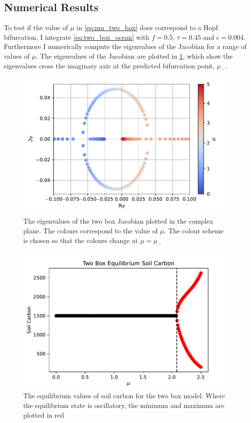 \subsection{Numerical Results}
To test if the value of $\mu$ in \cref{eq:mu_two_box} does correspond to a Hopf bifurcation, I integrate \cref{eq:two_box_ocean} with $f = 0.5$, $\tau = 0.45$ and $\epsilon = 0.004$.
Furthermore I numerically compute the eigenvalues of the Jacobian for a range of values of $\mu$. The eigenvalues of the Jacobian are plotted in \cref{fig:eigen_values_of_the_jacobian},
which show the eigenvalues cross the imaginary axis at the predicted bifurcation point, $\mu_-$.
\begin{figure}
  \centering
  \includegraphics[width=\textwidth,keepaspectratio]{complex_plane_two_box_eig}
  \caption{The eigenvalues of the two box Jacobian plotted in the complex plane. The colours correspond to the value of $\mu$. The colour scheme is chosen so that the colours change at $\mu = \mu_-$ }
  \label{fig:eigen_values_of_the_jacobian}
\end{figure}
\begin{figure}
  \centering
  \includegraphics[keepaspectratio,width=\textwidth]{two_box_model_soil_carbon_equilibrium}
  \caption{The equilibrium values of soil carbon for the two box model. Where the equilibrium state is oscillatory, the minimum and maximum are plotted in red}
  \label{fig:two_box_bf_diagram}
\end{figure}
